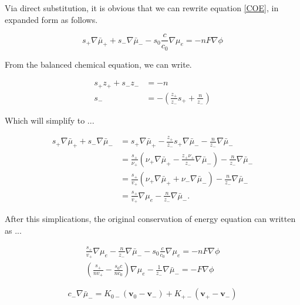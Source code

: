 \documentclass[lettersize,journal]{IEEEtran}
\begin{document}
\noindent Via direct substitution, it is obvious that we can rewrite equation \ref{COE}, in expanded form as follows.

\begin{equation}
s_{+} \nabla \bar{\mu}_{+}+s_{-} \nabla \bar{\mu}_{-}-s_{0} \frac{c}{c_{0}} \nabla \mu_{e}=-n F \nabla \phi
\end{equation}

From the balanced chemical equation, we can write.

\begin{equation}
\begin{aligned}
s_{+} z_{+}+s_{-} z_{-} &=-n \\
s_{-} &=-\left(\frac{z_{+}}{z_{-}} s_{+}+\frac{n}{z_{-}}\right)
\end{aligned}
\end{equation}

Which will simplify to ...


\begin{equation}
\begin{aligned}
s_{+} \nabla \bar{\mu}_{+}+s_{-} \nabla \bar{\mu}_{-} &=s_{+} \nabla \bar{\mu}_{+}-\frac{z_{+}}{z_{-}} s_{+} \nabla \bar{\mu}_{-}-\frac{n}{z_{-}} \nabla \bar{\mu}_{-} \\
&=\frac{s_{+}}{\nu_{+}}\left(\nu_{+} \nabla \bar{\mu}_{+}-\frac{z_{+} \nu_{+}}{z_{-}} \nabla \bar{\mu}_{-}\right)-\frac{n}{z_{-}} \nabla \bar{\mu}_{-} \\
&=\frac{s_{+}}{v_{+}}\left(\nu_{+} \nabla \bar{\mu}_{+}+\nu_{-} \nabla \bar{\mu}_{-}\right)-\frac{n}{z_{-}} \nabla \bar{\mu}_{-} \\
&=\frac{s_{+}}{v_{+}} \nabla \mu_{e}-\frac{n}{z_{-}} \nabla \bar{\mu}_{-} .
\end{aligned}
\end{equation}

After this simplications, the original conservation of energy equation can written as ...

\begin{equation}
\begin{array}{l}
\frac{s_{+}}{v_{+}} \nabla \mu_{e}-\frac{n}{z_{-}} \nabla \bar{\mu}_{-}-s_{0} \frac{c}{c_{0}} \nabla \mu_{e}=-n F \nabla \phi \\
\left(\frac{s_{+}}{n v_{+}}-\frac{s_{0} c}{n c_{0}}\right) \nabla \mu_{e}-\frac{1}{z_{-}} \nabla \bar{\mu}_{-}=-F \nabla \phi
\end{array}
\end{equation}

\begin{equation}
c_{-} \nabla \bar{\mu}_{-}=K_{0-}\left(\mathbf{v}_{0}-\mathbf{v}_{-}\right)+K_{+-}\left(\mathbf{v}_{+}-\mathbf{v}_{-}\right)
\end{equation}
\end{document}
